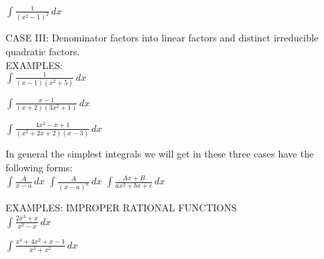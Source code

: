 \documentclass[11pt]{article}
\begin{document}
$\int \frac{1}{(x^2-1)^2} \, dx$


\pagebreak

CASE III: Denominator factors into linear factors and distinct irreducible quadratic factors.\\

EXAMPLES:\\

$\int \frac{1}{(x-1)(x^2+5)} \, dx$

\vspace{3.5in}

$\int \frac{x-1}{(x+2)(3x^2+1)} \, dx$


\pagebreak

$\int \frac{4x^2-x+1}{(x^2+2x+2)(x-3)} \, dx$



\vspace{6in}


In general the simplest integrals we will get in these three cases have the following forms:\\

$\int \frac{A}{x-a} \, dx$ \hspace{1in} $\int \frac{A}{(x-a)^n} \, dx$ \hspace{1in} $\int \frac{Ax+B}{ax^2+bx+c} \, dx$


\pagebreak

EXAMPLES: IMPROPER RATIONAL FUNCTIONS\\

$\int \frac{2x^3+x}{x^2-x} \, dx$

\vspace{3.5in}


$\int \frac{x^3+4x^2+x-1}{x^3+x^2} \, dx$


\end{document}
